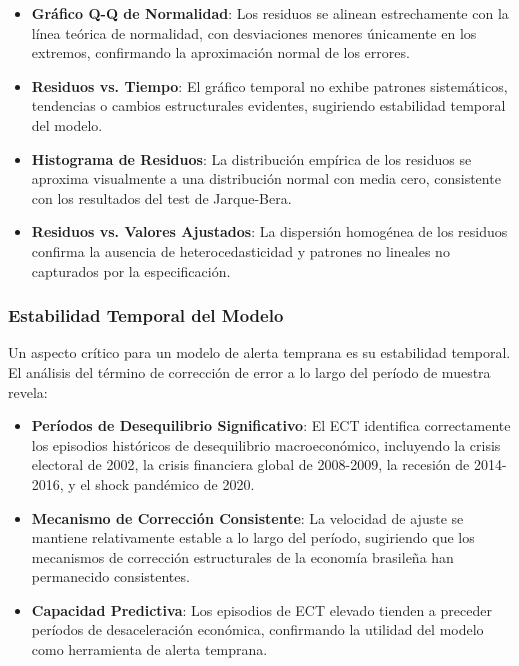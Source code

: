 \documentclass[3p,11pt]{elsarticle}
\begin{document}
\begin{itemize}
    \item \textbf{Gráfico Q-Q de Normalidad}: Los residuos se alinean estrechamente con la línea teórica de normalidad, con desviaciones menores únicamente en los extremos, confirmando la aproximación normal de los errores.
    
    \item \textbf{Residuos vs. Tiempo}: El gráfico temporal no exhibe patrones sistemáticos, tendencias o cambios estructurales evidentes, sugiriendo estabilidad temporal del modelo.
    
    \item \textbf{Histograma de Residuos}: La distribución empírica de los residuos se aproxima visualmente a una distribución normal con media cero, consistente con los resultados del test de Jarque-Bera.
    
    \item \textbf{Residuos vs. Valores Ajustados}: La dispersión homogénea de los residuos confirma la ausencia de heterocedasticidad y patrones no lineales no capturados por la especificación.
\end{itemize}

\subsubsection{Estabilidad Temporal del Modelo}

Un aspecto crítico para un modelo de alerta temprana es su estabilidad temporal. El análisis del término de corrección de error a lo largo del período de muestra revela:

\begin{itemize}
    \item \textbf{Períodos de Desequilibrio Significativo}: El ECT identifica correctamente los episodios históricos de desequilibrio macroeconómico, incluyendo la crisis electoral de 2002, la crisis financiera global de 2008-2009, la recesión de 2014-2016, y el shock pandémico de 2020.
    
    \item \textbf{Mecanismo de Corrección Consistente}: La velocidad de ajuste se mantiene relativamente estable a lo largo del período, sugiriendo que los mecanismos de corrección estructurales de la economía brasileña han permanecido consistentes.
    
    \item \textbf{Capacidad Predictiva}: Los episodios de ECT elevado tienden a preceder períodos de desaceleración económica, confirmando la utilidad del modelo como herramienta de alerta temprana.
\end{itemize}
\end{document}
